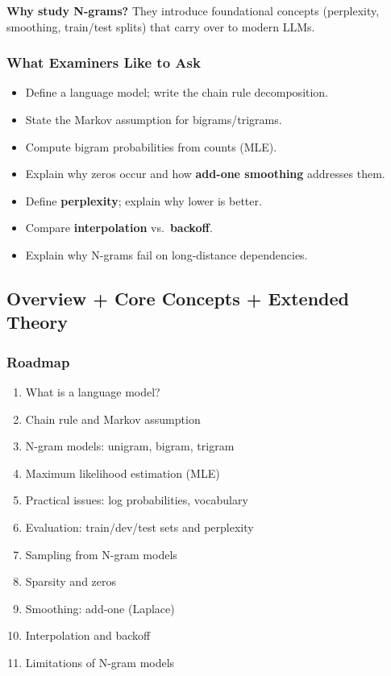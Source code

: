 \textbf{Why study N-grams?} They introduce foundational concepts (perplexity, smoothing, train/test splits) that carry over to modern LLMs.

\separator

\subsubsection*{What Examiners Like to Ask}

\begin{itemize}
  \item Define a language model; write the chain rule decomposition.
  \item State the Markov assumption for bigrams/trigrams.
  \item Compute bigram probabilities from counts (MLE).
  \item Explain why zeros occur and how \textbf{add-one smoothing} addresses them.
  \item Define \textbf{perplexity}; explain why lower is better.
  \item Compare \textbf{interpolation} vs.\ \textbf{backoff}.
  \item Explain why N-grams fail on long-distance dependencies.
\end{itemize}

\separator

\subsection{Overview + Core Concepts + Extended Theory}

\subsubsection*{Roadmap}
\begin{enumerate}
  \item What is a language model?
  \item Chain rule and Markov assumption
  \item N-gram models: unigram, bigram, trigram
  \item Maximum likelihood estimation (MLE)
  \item Practical issues: log probabilities, vocabulary
  \item Evaluation: train/dev/test sets and perplexity
  \item Sampling from N-gram models
  \item Sparsity and zeros
  \item Smoothing: add-one (Laplace)
  \item Interpolation and backoff
  \item Limitations of N-gram models
\end{enumerate}

